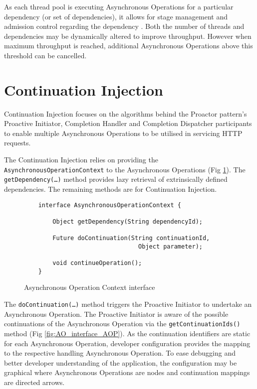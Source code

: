 \documentclass{article}
\begin{document}
As each thread pool is executing Asynchronous Operations for a particular
dependency (or set of dependencies), it allows for stage management and
admission control regarding the dependency \cite{seda}.  Both the number of
threads and dependencies may be dynamically altered to improve throughput. 
However when maximum throughput is reached, additional Asynchronous Operations
above this threshold can be cancelled.


\section{Continuation Injection}

Continuation Injection focuses on the algorithms behind the Proactor pattern's
Proactive Initiator, Completion Handler and Completion Dispatcher participants
to enable multiple Asynchronous Operations to be utilised in servicing HTTP
requests.

The Continuation Injection relies on providing the
\texttt{AsynchronousOperationContext} to the Asynchronous Operations (Fig
\ref{fig:AOC_interface}).  The \texttt{getDependency(\ldots)}
method provides lazy retrieval of extrinsically defined dependencies.  The
remaining methods are for Continuation Injection.

\begin{figure}[!t]
\begin{verbatim}
    interface AsynchronousOperationContext {
    
        Object getDependency(String dependencyId);
        
        Future doContinuation(String continuationId, 
                                Object parameter);
        
        void continueOperation();
    }
\end{verbatim}
\caption[Caption for Code]{Asynchronous Operation Context interface \footnotemark}
\label{fig:AOC_interface}
\end{figure}

The \texttt{doContinuation(\ldots)} method triggers the Proactive Initiator to
undertake an Asynchronous Operation.  The Proactive Initiator is aware of the
possible continuations of the Asynchronous Operation via the
\texttt{getContinuationIds()} method (Fig \ref{fig:AO_interface_AOP}).  As the
continuation identifiers are static for each Asynchronous Operation, developer
configuration provides the mapping to the respective handling Asynchronous
Operation.  To ease debugging and better developer understanding of the
application, the configuration may be graphical where Asynchronous Operations
are nodes and continuation mappings are directed arrows.
\end{document}
